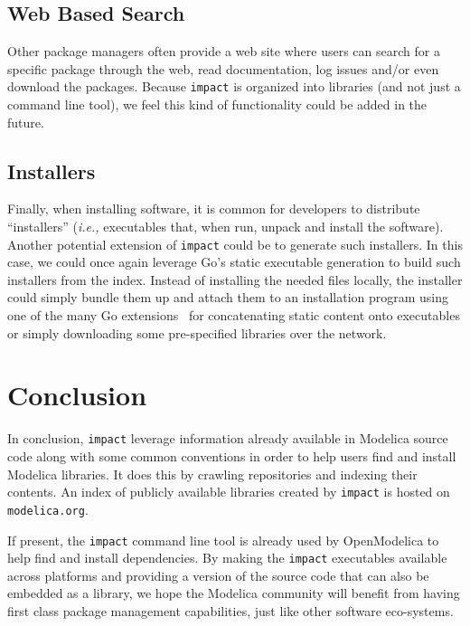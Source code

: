 \documentclass[11pt,a4paper,twocolumn]{article}
\newcommand{\code}[1]{\texttt{#1}} %
\begin{document}
\subsection{Web Based Search}

Other package managers often provide a web site where users can search
for a specific package through the web, read documentation, log issues
and/or even download the packages.  Because \code{impact} is organized
into libraries (and not just a command line tool), we feel this kind
of functionality could be added in the future.

\subsection{Installers}

Finally, when installing software, it is common for developers to
distribute ``installers'' ({\it i.e.,} executables that, when run,
unpack and install the software).  Another potential extension of
\code{impact} could be to generate such installers.  In this case, we
could once again leverage Go's static executable generation to build
such installers from the index.  Instead of installing the needed
files locally, the installer could simply bundle them up and attach
them to an installation program using one of the many Go
extensions~\parencite{GeertJohan/go.rice,tebeka/nrsc}
for concatenating static content onto executables or simply
downloading some pre-specified libraries over the network.

\section{Conclusion}

In conclusion, \code{impact} leverage information already available in
Modelica source code along with some common conventions in order to
help users find and install Modelica libraries.  It does this by
crawling repositories and indexing their contents.  An index of
publicly available libraries created by \code{impact} is hosted on
\code{modelica.org}.

If present, the \code{impact} command line tool is already used by
OpenModelica to help find and install dependencies.  By making the
\code{impact} executables available across platforms and providing a
version of the source code that can also be embedded as a library, we
hope the Modelica community will benefit from having first class
package management capabilities, just like other software eco-systems.
\end{document}
